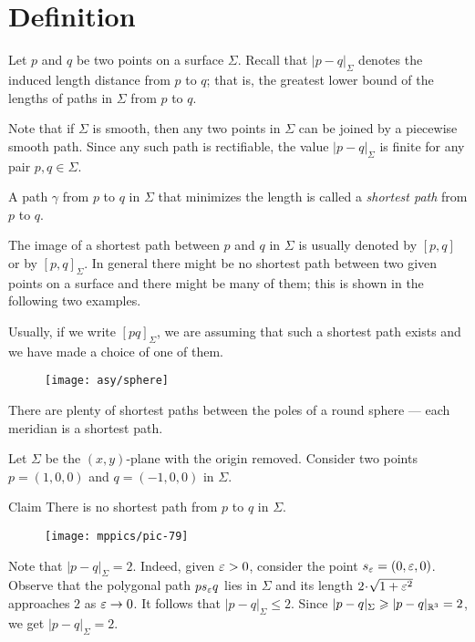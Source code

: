 \section{Definition}

Let $p$ and $q$ be two points on a surface $\Sigma$.
Recall that $|p-q|_\Sigma$ denotes the induced length distance from $p$ to $q$;
that is, the greatest lower bound of the lengths of paths in $\Sigma$ from $p$ to $q$.

Note that if $\Sigma$ is smooth, then any two points in $\Sigma$ can be joined by a piecewise smooth path.
Since any such path is rectifiable, the value $|p-q|_\Sigma$ is finite for any pair $p,q\in\Sigma$.

A path $\gamma$ from $p$ to $q$ in $\Sigma$ that minimizes the length is called a \emph{shortest path} from $p$ to $q$.

The image of a shortest path between $p$ and $q$ in $\Sigma$ is usually denoted by $[p,q]$ or by $[p,q]_\Sigma$.
In general there might be no shortest path between two given points on a surface and there might be many of them;
this is shown in the following two examples.

Usually, if we write $[pq]_\Sigma$, we are assuming that such a shortest path exists and we have made a choice of one of them.

{

\begin{wrapfigure}{r}{28 mm}
\vskip-6mm
\centering
\texttt{[image: asy/sphere]}
\end{wrapfigure}

 There are plenty of shortest paths between the poles of a round sphere --- each meridian is a shortest path.

 Let $\Sigma$ be the $(x,y)$-plane with the origin removed.
Consider two points $p=(1,0,0)$ and $q=(-1,0,0)$ in $\Sigma$.

}

\begin{thm}{Claim}
There is no shortest path from $p$ to $q$ in $\Sigma$.
\end{thm}

\begin{wrapfigure}{r}{28 mm}
\vskip-4mm
\centering
\texttt{[image: mppics/pic-79]}
\end{wrapfigure}

Note that $|p-q|_\Sigma=2$. 
Indeed, given $\eps\z>0$, consider the point $s_\varepsilon=(0,\varepsilon,0)$.
Observe that the polygonal path $ps_\varepsilon q$ lies in $\Sigma$ and its length $2\cdot\sqrt{1+\eps^2}$ approaches $2$ as $\varepsilon\to0$.
It follows that $|p-q|_\Sigma\le 2$.
Since $|p-q|_\Sigma\geqslant |p-q|_{\mathbb{R}^3}=2$, we get $|p-q|_\Sigma=2$.


